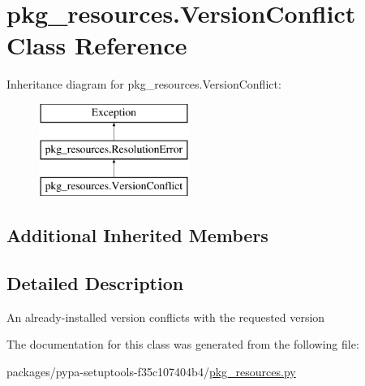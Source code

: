 \hypertarget{classpkg__resources_1_1VersionConflict}{}\section{pkg\+\_\+resources.\+Version\+Conflict Class Reference}
\label{classpkg__resources_1_1VersionConflict}
Inheritance diagram for pkg\+\_\+resources.\+Version\+Conflict\+:\begin{figure}[H]
\begin{center}
\leavevmode
\includegraphics[height=3.000000cm]{classpkg__resources_1_1VersionConflict}
\end{center}
\end{figure}
\subsection*{Additional Inherited Members}


\subsection{Detailed Description}
\begin{DoxyVerb}An already-installed version conflicts with the requested version\end{DoxyVerb}
 

The documentation for this class was generated from the following file\+:\begin{DoxyCompactItemize}
\item 
packages/pypa-\/setuptools-\/f35c107404b4/\hyperlink{pkg__resources_8py}{pkg\+\_\+resources.\+py}\end{DoxyCompactItemize}
